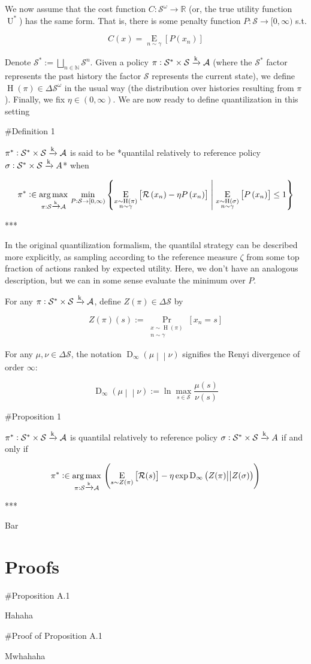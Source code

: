 \documentclass[a4paper]{article}
\newcommand{\AP}[1]{\left(#1\right)}
\newcommand{\AB}[1]{\left[#1\right]}
\newcommand{\ACM}[2]{\left\{#1\;\middle\vert\;#2\right\}}
\newcommand{\Pa}[2]{\underset{#1}{\operatorname{Pr}}\AB{#2}}
\newcommand{\Ea}[2]{\underset{#1}{\operatorname{E}}\AB{#2}}
\newcommand{\RD}[3]{\operatorname{D}_{#1}\AP{#2\middle\vert\middle\vert#3}}
\newcommand{\Argmax}[1]{\underset{#1}{\operatorname{arg\,max}}\,}
\newcommand{\Nats}{\mathbb{N}}
\newcommand{\Reals}{\mathbb{R}}
\newcommand{\K}{\xrightarrow{\textnormal{k}}}
\newcommand{\A}{\mathcal{A}}
\newcommand{\St}{\mathcal{S}}
\newcommand{\R}{\mathcal{R}}
\newcommand{\Pe}{P}
\newcommand{\Ut}{\operatorname{U}}
\newcommand{\Co}{C}
\newcommand{\Hi}{\operatorname{H}}
\newcommand{\Z}{Z}
\begin{document}
We now assume that the cost function $\Co: \St^\omega \rightarrow \Reals$ (or, the true utility function $\Ut^*$) has the same form. That is, there is some penalty function $\Pe: \St \rightarrow [0,\infty)$ s.t.

$$\Co(x) = \Ea{n\sim\gamma}{\Pe\AP{x_n}}$$

Denote $\St^*:=\bigsqcup_{n\in\Nats}\St^n$. Given a policy $\pi: \St^*\times\St \K \A$ (where the $\St^*$ factor represents the past history the factor $\St$ represents the current state), we define $\Hi(\pi) \in \Delta\St^\omega$ in the usual way (the distribution over histories resulting from $\pi$). Finally, we fix $\eta \in (0,\infty)$. We are now ready to define quantilization in this setting

\#Definition 1

$\pi^* : \St^*\times\St \K \A$ is said to be *quantilal relatively to reference policy $\sigma: \St^*\times\St \K A$* when

$$\pi^* :\in \Argmax{\pi: \St \K \A}\min_{\Pe:\St\rightarrow[0,\infty)}\ACM{\Ea{\substack{x\sim\Hi(\pi)\\n\sim\gamma}}{\R\AP{x_n}-\eta\Pe\AP{x_n}}}{\Ea{\substack{x\sim\Hi(\sigma)\\n\sim\gamma}}{\Pe\AP{x_n}}\leq1}$$

***

In the original quantilization formalism, the quantilal strategy can be described more explicitly, as sampling according to the reference measure $\zeta$ from some top fraction of actions ranked by expected utility. Here, we don't have an analogous description, but we can in some sense evaluate the minimum over $\Pe$.

For any $\pi: \St^*\times\St \K \A$, define $\Z(\pi)\in\Delta\St$ by

$$\Z(\pi)(s):=\Pa{\substack{x\sim\Hi(\pi)\\n\sim\gamma}}{x_n=s}$$

For any $\mu,\nu\in\Delta\St$, the notation $\RD{\infty}{\mu}{\nu}$ signifies the Renyi divergence of order $\infty$:

$$\RD{\infty}{\mu}{\nu} := \ln \max_{s\in\St}\frac{\mu(s)}{\nu(s)}$$

\#Proposition 1

$\pi^* : \St^*\times\St \K \A$ is quantilal relatively to reference policy $\sigma: \St^*\times\St \K A$ if and only if

$$\pi^* :\in \Argmax{\pi: \St \K \A}\AP{\Ea{s\sim\Z(\pi)}{\R(s)}-\eta \exp{\RD{\infty}{\Z(\pi)}{\Z(\sigma)}}}$$

***

Bar

\section{Proofs}

\#Proposition A.1

Hahaha

\#Proof of Proposition A.1

Mwhahaha
\end{document}
